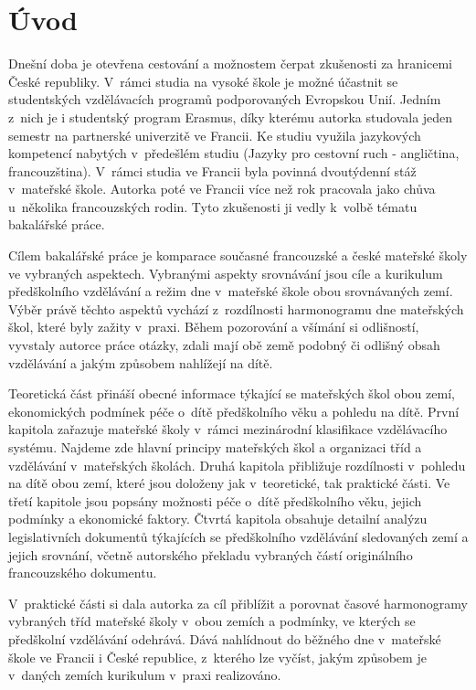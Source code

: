 \chapter*{Úvod}
\vspace{-5mm}
Dnešní doba je otevřena cestování a možnostem čerpat zkušenosti za hranicemi České republiky. V~rámci studia na vysoké škole je možné účastnit se studentských vzdělávacích programů podporovaných Evropskou Unií. Jedním z~nich je i studentský program Erasmus, díky kterému autorka studovala jeden semestr na partnerské univerzitě ve Francii. Ke studiu využila jazykových kompetencí nabytých v~předešlém studiu (Jazyky pro cestovní ruch - angličtina, francouzština). V~rámci studia ve Francii byla povinná dvoutýdenní stáž v~mateřské škole. Autorka poté ve Francii více než rok pracovala jako chůva u~několika francouzských rodin. Tyto zkušenosti ji vedly k~volbě tématu bakalářské práce. 

Cílem bakalářské práce je komparace současné francouzské a české mateřské školy ve vybraných aspektech. Vybranými aspekty srovnávání jsou cíle a kurikulum předškolního vzdělávání a režim dne v mateřské škole obou srovnávaných zemí. Výběr právě těchto aspektů vychází z~rozdílnosti harmonogramu dne mateřských škol, které byly zažity v~praxi. Během pozorování a všímání si odlišností, vyvstaly autorce práce otázky, zdali mají obě země podobný či odlišný obsah vzdělávání a jakým způsobem nahlížejí na dítě. 


Teoretická část přináší obecné informace týkající se mateřských škol obou zemí, ekonomických podmínek péče o~dítě předškolního věku a pohledu na dítě. První kapitola zařazuje mateřské školy v~rámci mezinárodní klasifikace vzdělávacího systému. Najdeme zde hlavní principy mateřských škol a organizaci tříd a vzdělávání v~mateřských školách. Druhá kapitola přibližuje rozdílnosti v~pohledu na dítě obou zemí, které jsou doloženy jak v~teoretické, tak praktické části. Ve třetí kapitole jsou popsány možnosti péče o~dítě předškolního věku, jejich podmínky a ekonomické faktory. Čtvrtá kapitola obsahuje detailní analýzu legislativních dokumentů týkajících se předškolního vzdělávání sledovaných zemí a jejich srovnání, včetně autorského překladu vybraných částí originálního francouzského dokumentu.

V~praktické části si dala autorka za cíl přiblížit a porovnat časové harmonogramy vybraných tříd mateřské školy v~obou zemích a podmínky, ve kterých se předškolní vzdělávání odehrává. Dává nahlídnout do běžného dne v~mateřské škole ve Francii i České republice, z~kterého lze vyčíst, jakým způsobem je v~daných zemích kurikulum v~praxi realizováno.  